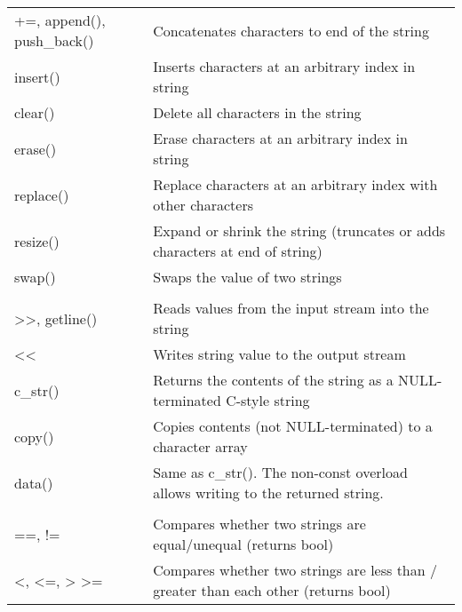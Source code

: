 \documentclass[../../LearnCpp.tex]{subfiles}
\begin{document}
\begin{center}
\begin{tiny}
\begin{tabularx}{ 1\textwidth}{
        | >{\raggedright\arraybackslash}X
        | >{\raggedright\arraybackslash}X |
      }
      +=, append(), push\_back() & Concatenates characters to end of the string                                        \\
      insert()                   & Inserts characters at an arbitrary index in string                                  \\
      clear()                    & Delete all characters in the string                                                 \\
      erase()                    & Erase characters at an arbitrary index in string                                    \\
      replace()                  & Replace characters at an arbitrary index with other characters                      \\
      resize()                   & Expand or shrink the string (truncates or adds characters at end of string)         \\
      swap()                     & Swaps the value of two strings                                                      \\
      \hline
      \multicolumn{2}{|c|}{Input and Output}                                                                           \\
      \hline
      >>, getline()              & Reads values from the input stream into the string                                  \\
      <<                         & Writes string value to the output stream                                            \\
      c\_str()                   & Returns the contents of the string as a NULL-terminated C-style string              \\
      copy()                     & Copies contents (not NULL-terminated) to a character array                          \\
      data()                     & Same as c\_str(). The non-const overload allows writing to the returned string.     \\
      \hline
      \multicolumn{2}{|c|}{String comparison}                                                                          \\
      \hline
      ==, !=                     & Compares whether two strings are equal/unequal (returns bool)                       \\
      <, <=, > >=                & Compares whether two strings are less than / greater than each other (returns bool) \\

\end{tabularx}
\end{tiny}
\end{center}
\end{document}
